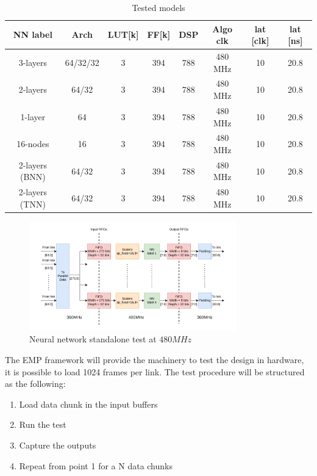 \documentclass[../../main.tex]{subfiles}
\begin{document}
\begin{center}
    \begin{table}[h]
    \centering
    \begin{tabular}{|c|c|c|c|c|c|c|c|}
        \hline
        NN label & Arch & LUT[k] & FF[k] & DSP & Algo clk & lat [clk] & lat [ns] \\ 
        \hline \hline
        3-layers       & 64/32/32 & 3  & 394 & 788 & 480 MHz & 10 & 20.8 \\
        2-layers       & 64/32    & 3  & 394 & 788 & 480 MHz & 10 & 20.8    \\
        1-layer        & 64       & 3  & 394 & 788 & 480 MHz & 10 & 20.8       \\
        16-nodes       & 16       & 3  & 394 & 788 & 480 MHz & 10 & 20.8       \\
        2-layers (BNN) & 64/32    & 3  & 394 & 788 & 480 MHz & 10 & 20.8    \\
        2-layers (TNN) & 64/32    & 3  & 394 & 788 & 480 MHz & 10 & 20.8    \\
        \hline
    \end{tabular}
    \caption{Tested models}
    \label{tab:NN-summary}
    \end{table}
\end{center}

\begin{figure}[h]
    \centering
    \includegraphics[width=0.8\textwidth]{sections/05/Images/GT_NN_standalone.pdf}
    \caption{Neural network standalone test at $480MHz$}
    \label{fig:GT-standalone-diag}
\end{figure}

The EMP framework will provide the machinery to test the design in hardware, it is possible to load 1024 frames per link. The test procedure will be structured as the following:
\begin{enumerate}
    \item Load data chunk in the input buffers
    \item Run the test
    \item Capture the outputs
    \item Repeat from point 1 for a N data chunks
\end{enumerate}
\end{document}
